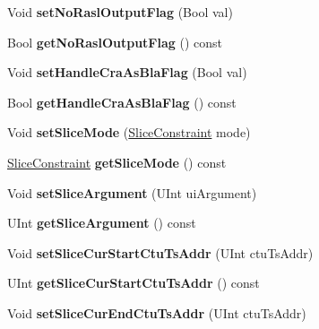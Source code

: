 \begin{DoxyCompactItemize}
Void {\bfseries set\+No\+Rasl\+Output\+Flag} (Bool val)
\item 
\mbox{\label{class_t_com_slice_a3dee262aaff8cfa5a57e86021be68a4b}} 
Bool {\bfseries get\+No\+Rasl\+Output\+Flag} () const
\item 
\mbox{\label{class_t_com_slice_a37de9a5da11670dde843867f5ee845af}} 
Void {\bfseries set\+Handle\+Cra\+As\+Bla\+Flag} (Bool val)
\item 
\mbox{\label{class_t_com_slice_a74cc04cdc3c5f63c757ad7abdf49b25d}} 
Bool {\bfseries get\+Handle\+Cra\+As\+Bla\+Flag} () const
\item 
\mbox{\label{class_t_com_slice_ac66b444e6ede56ab401f8817b7ac4a6e}} 
Void {\bfseries set\+Slice\+Mode} (\hyperlink{_type_def_8h_add7235a66eb4e5f93c692468c39dde44}{Slice\+Constraint} mode)
\item 
\mbox{\label{class_t_com_slice_a2c9941e6bbf99437dc17195c0fa65a43}} 
\hyperlink{_type_def_8h_add7235a66eb4e5f93c692468c39dde44}{Slice\+Constraint} {\bfseries get\+Slice\+Mode} () const
\item 
\mbox{\label{class_t_com_slice_a1d4a5ef328a9fd91d77322d2b1ab3a94}} 
Void {\bfseries set\+Slice\+Argument} (U\+Int ui\+Argument)
\item 
\mbox{\label{class_t_com_slice_adfde9aceffa2570f7d4cc1a1694c0311}} 
U\+Int {\bfseries get\+Slice\+Argument} () const
\item 
\mbox{\label{class_t_com_slice_a5581bc2077c7cf309a635c26df682875}} 
Void {\bfseries set\+Slice\+Cur\+Start\+Ctu\+Ts\+Addr} (U\+Int ctu\+Ts\+Addr)
\item 
\mbox{\label{class_t_com_slice_aa6b9a7e8ebf62af285ade38342ddb072}} 
U\+Int {\bfseries get\+Slice\+Cur\+Start\+Ctu\+Ts\+Addr} () const
\item 
\mbox{\label{class_t_com_slice_af549011a8e03fce0912e8865c5c8ebcc}} 
Void {\bfseries set\+Slice\+Cur\+End\+Ctu\+Ts\+Addr} (U\+Int ctu\+Ts\+Addr)
\item 

\end{DoxyCompactItemize}
